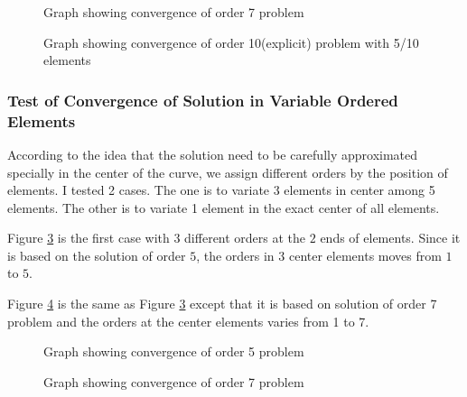 \begin{figure}[h]
\begin{center}
\caption{\label{crvconvf4}Graph showing convergence of order 7
problem}
\end{center}
\end{figure}

\begin{figure}[h]
\begin{center}
\caption{\label{crvconvf4}Graph showing convergence of order
10(explicit) problem with 5/10 elements}
\end{center}
\end{figure}


\subsubsection{Test of Convergence of Solution in Variable Ordered
Elements}

According to the idea that the solution need to be carefully
approximated specially in the center of the curve, we assign
different orders by the position of elements. I tested 2 cases.
The one is to variate 3 elements in center among 5 elements. The
other is to variate 1 element in the exact center of all elements.

Figure \ref{crvconvf5} is the first case with 3 different orders
at the $2$ ends of elements. Since it is based on the solution of
order $5$, the orders in 3 center elements moves from $1$ to $5$.

Figure \ref{crvconvf6} is the same as Figure \ref{crvconvf5}
except that it is based on solution of order 7 problem and the
orders at the center elements varies from 1 to 7.


\begin{figure}[h]
\begin{center}
\caption{\label{crvconvf5}Graph showing convergence of order 5
problem}
\end{center}
\end{figure}

\begin{figure}[h]
\begin{center}
\caption{\label{crvconvf6}Graph showing convergence of order 7
problem}
\end{center}
\end{figure}

